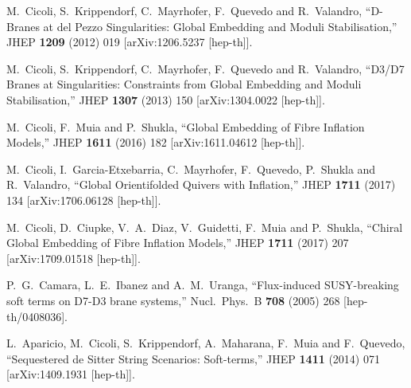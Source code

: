 \documentclass[11pt,a4paper]{article}
\begin{document}
\begin{itemize}
\begin{thebibliography}{99}
  M.~Cicoli, S.~Krippendorf, C.~Mayrhofer, F.~Quevedo and R.~Valandro,
  ``D-Branes at del Pezzo Singularities: Global Embedding and Moduli Stabilisation,''
  JHEP {\bf 1209} (2012) 019
  [arXiv:1206.5237 [hep-th]].

  M.~Cicoli, S.~Krippendorf, C.~Mayrhofer, F.~Quevedo and R.~Valandro,
  ``D3/D7 Branes at Singularities: Constraints from Global Embedding and Moduli Stabilisation,''
  JHEP {\bf 1307} (2013) 150
  [arXiv:1304.0022 [hep-th]].

  M.~Cicoli, F.~Muia and P.~Shukla,
  ``Global Embedding of Fibre Inflation Models,''
  JHEP {\bf 1611} (2016) 182
  [arXiv:1611.04612 [hep-th]].

  M.~Cicoli, I.~Garcia-Etxebarria, C.~Mayrhofer, F.~Quevedo, P.~Shukla and R.~Valandro,
  ``Global Orientifolded Quivers with Inflation,''
  JHEP {\bf 1711} (2017) 134
  [arXiv:1706.06128 [hep-th]].

  M.~Cicoli, D.~Ciupke, V.~A.~Diaz, V.~Guidetti, F.~Muia and P.~Shukla,
  ``Chiral Global Embedding of Fibre Inflation Models,''
  JHEP {\bf 1711} (2017) 207
  [arXiv:1709.01518 [hep-th]].

  P.~G.~Camara, L.~E.~Ibanez and A.~M.~Uranga,
  ``Flux-induced SUSY-breaking soft terms on D7-D3 brane systems,''
  Nucl.\ Phys.\ B {\bf 708} (2005) 268
  [hep-th/0408036].

  L.~Aparicio, M.~Cicoli, S.~Krippendorf, A.~Maharana, F.~Muia and F.~Quevedo,
  ``Sequestered de Sitter String Scenarios: Soft-terms,''
  JHEP {\bf 1411} (2014) 071
  [arXiv:1409.1931 [hep-th]].


\end{thebibliography}
\end{itemize}
\end{document}
